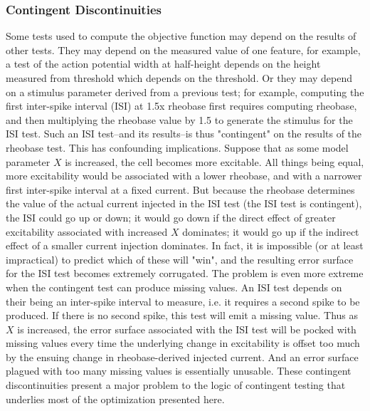 \subsubsection{Contingent Discontinuities}




Some tests used to compute the objective function may depend on the results of other tests.
They may depend on the measured value of one feature, for example, a test of the action potential width at half-height depends on the height measured from threshold which depends on the threshold.
Or they may depend on a stimulus parameter derived from a previous test; for example, computing the first inter-spike interval (ISI) at 1.5x rheobase first requires computing rheobase, and then multiplying the rheobase value by 1.5 to generate the stimulus for the ISI test.
Such an ISI test--and its results--is thus "contingent" on the results of the rheobase test.
This has confounding implications.
Suppose that as some model parameter $X$ is increased, the cell becomes more excitable.
All things being equal, more excitability would be associated with a lower rheobase, and with a narrower first inter-spike interval at a fixed current.
But because the rheobase determines the value of the actual current injected in the ISI test (the ISI test is contingent), the ISI could go up or down; it would go down if the direct effect of greater excitability associated with increased $X$ dominates; it would go up if the indirect effect of a smaller current injection dominates.
In fact, it is impossible (or at least impractical) to predict which of these will "win", and the resulting error surface for the ISI test becomes extremely corrugated.
The problem is even more extreme when the contingent test can produce missing values.
An ISI test depends on their being an inter-spike interval to measure, i.e. it requires a second spike to be produced.
If there is no second spike, this test will emit a missing value.
Thus as $X$ is increased, the error surface associated with the ISI test will be pocked with missing values every time the underlying change in excitability is offset too much by the ensuing change in rheobase-derived injected current.
And an error surface plagued with too many missing values is essentially unusable.
These contingent discontinuities present a major problem to the logic of contingent testing that underlies most of the optimization presented here.

